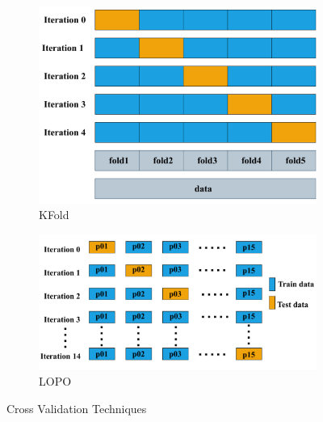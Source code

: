 \begin{figure}[H]
  \centering
  \hspace*{-2cm} %
  \begin{subfigure}[b]{0.50\columnwidth} %
      \includegraphics[width=\textwidth]{images/kfold.drawio.pdf}
      \caption{KFold}
      \label{fig:phone1}
  \end{subfigure}
  \hspace{0.05\columnwidth} %
  \begin{subfigure}[b]{0.65\columnwidth}
      \includegraphics[width=\textwidth]{images/Lopo.drawio.pdf}
      \caption{LOPO}
      \label{fig:phone2}
  \end{subfigure}
  \caption{Cross Validation Techniques}
  \label{fig:CROSSVAL}
\end{figure}

